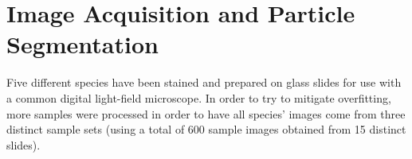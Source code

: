 \section{Image Acquisition and Particle Segmentation}

Five different species have been stained and prepared on glass slides for use with a common digital light-field microscope. In order to try to mitigate overfitting, more samples were processed in order to have all species’ images come from three distinct sample sets (using a total of 600 sample images obtained from 15 distinct slides).
  
  
  
  